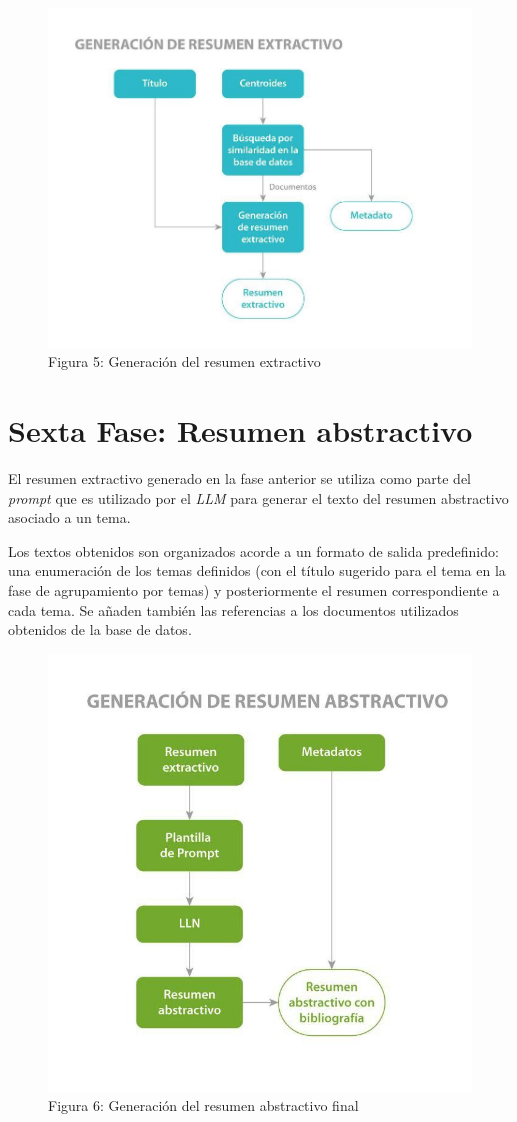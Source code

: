     \begin{figure}[H]    
        \centering
        \includegraphics[scale = 0.25]{Figures/pipeline_4.jpg}
        \caption*{Figura 5: Generación del resumen extractivo}
    \end{figure}

    \section{Sexta Fase: Resumen abstractivo}
    El resumen extractivo generado en la fase anterior se utiliza como parte del \emph{prompt} que es utilizado por el \emph{LLM} para generar el texto del resumen abstractivo asociado a un tema.

    Los textos obtenidos son organizados acorde a un formato de salida predefinido: una enumeración de los temas definidos (con el título sugerido para el tema en la fase de agrupamiento por temas) y posteriormente el resumen correspondiente a cada tema. Se añaden también las referencias a los documentos utilizados obtenidos de la base de datos.

    \begin{figure}[H]    
        \centering
        \includegraphics[scale = 0.25]{Figures/pipeline_5.jpg}
        \caption*{Figura 6: Generación del resumen abstractivo final}
    \end{figure}
